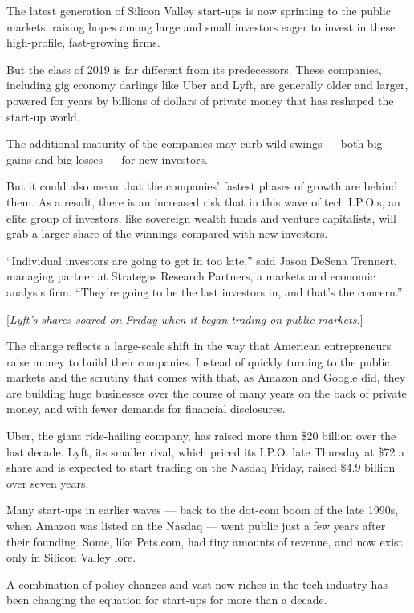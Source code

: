 The latest generation of Silicon Valley start-ups is now sprinting to
the public markets, raising hopes among large and small investors eager
to invest in these high-profile, fast-growing firms.

But the class of 2019 is far different from its predecessors. These
companies, including gig economy darlings like Uber and Lyft, are
generally older and larger, powered for years by billions of dollars of
private money that has reshaped the start-up world.

The additional maturity of the companies may curb wild swings --- both
big gains and big losses --- for new investors.

But it could also mean that the companies' fastest phases of growth are
behind them. As a result, there is an increased risk that in this wave
of tech I.P.O.s, an elite group of investors, like sovereign wealth
funds and venture capitalists, will grab a larger share of the winnings
compared with new investors.

``Individual investors are going to get in too late,'' said Jason DeSena
Trennert, managing partner at Strategas Research Partners, a markets and
economic analysis firm. ``They're going to be the last investors in, and
that's the concern.''

{[}\href{https://www.nytimes3xbfgragh.onion/2019/03/29/technology/lyft-stock-price.html}{\emph{Lyft's
shares soared on Friday when it began trading on public markets.}}{]}

The change reflects a large-scale shift in the way that American
entrepreneurs raise money to build their companies. Instead of quickly
turning to the public markets and the scrutiny that comes with that, as
Amazon and Google did, they are building huge businesses over the course
of many years on the back of private money, and with fewer demands for
financial disclosures.

Uber, the giant ride-hailing company, has raised more than \$20 billion
over the last decade. Lyft, its smaller rival, which priced its I.P.O.
late Thursday at \$72 a share and is expected to start trading on the
Nasdaq Friday, raised \$4.9 billion over seven years.

Many start-ups in earlier waves --- back to the dot-com boom of the late
1990s, when Amazon was listed on the Nasdaq --- went public just a few
years after their founding. Some, like Pets.com, had tiny amounts of
revenue, and now exist only in Silicon Valley lore.

A combination of policy changes and vast new riches in the tech industry
has been changing the equation for start-ups for more than a decade.


